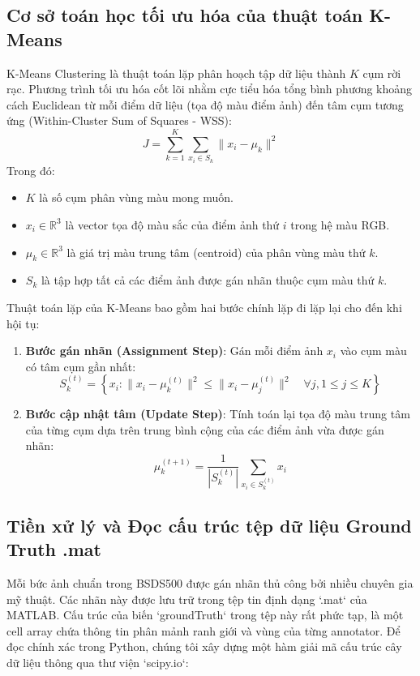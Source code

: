 \documentclass[a4paper]{article}
\begin{document}
\subsection{Cơ sở toán học tối ưu hóa của thuật toán K-Means}
K-Means Clustering là thuật toán lặp phân hoạch tập dữ liệu thành $K$ cụm rời rạc. Phương trình tối ưu hóa cốt lõi nhằm cực tiểu hóa tổng bình phương khoảng cách Euclidean từ mỗi điểm dữ liệu (tọa độ màu điểm ảnh) đến tâm cụm tương ứng (Within-Cluster Sum of Squares - WSS):
\begin{equation}
    J = \sum_{k=1}^{K} \sum_{x_i \in S_k} \| x_i - \mu_k \|^2
\end{equation}
Trong đó:
\begin{itemize}
    \item $K$ là số cụm phân vùng màu mong muốn.
    \item $x_i \in \mathbb{R}^3$ là vector tọa độ màu sắc của điểm ảnh thứ $i$ trong hệ màu RGB.
    \item $\mu_k \in \mathbb{R}^3$ là giá trị màu trung tâm (centroid) của phân vùng màu thứ $k$.
    \item $S_k$ là tập hợp tất cả các điểm ảnh được gán nhãn thuộc cụm màu thứ $k$.
\end{itemize}

Thuật toán lặp của K-Means bao gồm hai bước chính lặp đi lặp lại cho đến khi hội tụ:
\begin{enumerate}
    \item \textbf{Bước gán nhãn (Assignment Step)}: Gán mỗi điểm ảnh $x_i$ vào cụm màu có tâm cụm gần nhất:
    \begin{equation}
        S_k^{(t)} = \left\{ x_i : \| x_i - \mu_k^{(t)} \|^2 \leq \| x_i - \mu_j^{(t)} \|^2 \quad \forall j, 1 \leq j \leq K \right\}
    \end{equation}
    \item \textbf{Bước cập nhật tâm (Update Step)}: Tính toán lại tọa độ màu trung tâm của từng cụm dựa trên trung bình cộng của các điểm ảnh vừa được gán nhãn:
    \begin{equation}
        \mu_k^{(t+1)} = \frac{1}{|S_k^{(t)}|} \sum_{x_i \in S_k^{(t)}} x_i
    \end{equation}
\end{enumerate}

\subsection{Tiền xử lý và Đọc cấu trúc tệp dữ liệu Ground Truth .mat}
Mỗi bức ảnh chuẩn trong BSDS500 được gán nhãn thủ công bởi nhiều chuyên gia mỹ thuật. Các nhãn này được lưu trữ trong tệp tin định dạng `.mat` của MATLAB. Cấu trúc của biến `groundTruth` trong tệp này rất phức tạp, là một cell array chứa thông tin phân mảnh ranh giới và vùng của từng annotator. Để đọc chính xác trong Python, chúng tôi xây dựng một hàm giải mã cấu trúc cây dữ liệu thông qua thư viện `scipy.io`:
\end{document}

